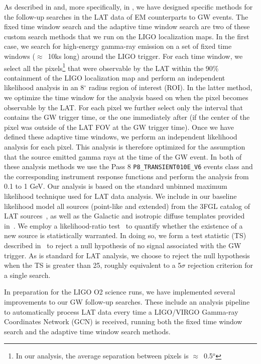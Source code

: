 \documentclass{aastex61}
\begin{document}
As described in \citet{Ackermann16,Racusin17} and, more specifically, in \citet{Vianello17}, we have designed specific methods for the follow-up searches in the LAT data of EM counterparts to GW events. The fixed time window search and the adaptive time window search are two of these custom search methods that we run on the LIGO localization maps. In the first case, we search for high-energy gamma-ray emission on a set of fixed time windows ($\approx$~10ks long) around the LIGO trigger. For each time window, we select all the pixels\footnote{In our analysis, the average separation between pixels is $\approx$~0.5$^{o}$} that were observable by the LAT within the 90\% containment of the LIGO localization map and perform an independent likelihood analysis in an 8$^{\circ}$ radius region of interest (ROI). In the latter method, we optimize the time window for the analysis based on when the pixel becomes observable by the LAT. For each pixel we further select only the interval that contains the GW trigger time, or the one immediately after (if the center of the pixel was outside of the LAT FOV at the GW trigger time). Once we have defined these adaptive time windows, we perform an independent likelihood analysis for each pixel. This  analysis  is  therefore  optimized  for  the  assumption that the source emitted gamma rays at the time of the GW event. In both of these analysis methods we use the Pass 8 \texttt{P8\_TRANSIENT010E\_V6} events class and the corresponding instrument response functions and perform the analysis from 0.1 to 1 GeV. Our  analysis  is  based  on  the  standard  unbinned  maximum  likelihood  technique  used  for LAT data analysis.  We include in our baseline likelihood  model  all  sources  (point-like  and  extended)  from  the  3FGL catalog of LAT sources~\citep{Acero2015},   as  well  as  the  Galactic and isotropic diffuse templates provided in~\citet{Acero2016}. We  employ  a  likelihood-ratio  test~\citep{Neyman1928} to quantify whether the existence of a new source is statistically warranted.  In doing so, we form a test statistic (TS) described in~\citet{Vianello17} to reject a null hypothesis of no signal associated with the GW trigger.
As is standard for LAT analysis, we choose to reject the null hypothesis when the TS is greater than 25, roughly equivalent to a 5$\sigma$ rejection criterion for a single search.

In preparation for the LIGO O2 science runs, we have implemented several improvements to our GW follow-up searches. These include an analysis pipeline to automatically process LAT data every time a LIGO/VIRGO Gamma-ray Coordinates Network (GCN) is received, running both the fixed time window search and the adaptive time window search methods.
\end{document}
